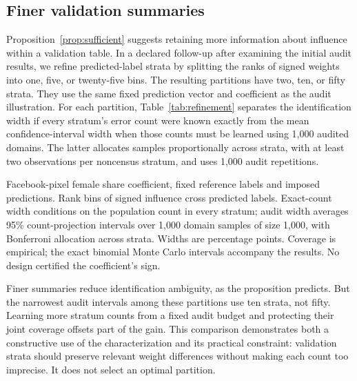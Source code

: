 \subsection{Finer validation summaries}
Proposition~\ref{prop:sufficient} suggests retaining more information about
influence within a validation table. In a declared follow-up after examining
the initial audit results, we refine predicted-label strata by splitting the
ranks of signed weights into one, five, or twenty-five bins. The resulting
partitions have two, ten, or fifty strata. They use the same fixed prediction
vector and coefficient as the audit illustration. For each partition,
Table~\ref{tab:refinement} separates the identification width if every stratum's
error count were known exactly from the mean confidence-interval width when
those counts must be learned using 1,000 audited domains. The latter allocates
samples proportionally across strata, with at least two observations per
noncensus stratum, and uses 1,000 audit repetitions.

\begin{table}[htbp]
\centering\small
\caption{Refining validation reduces ambiguity but divides the audit budget}
\label{tab:refinement}

\par\smallskip
\begin{minipage}{\linewidth}\footnotesize
Facebook-pixel female share coefficient, fixed reference labels and imposed
predictions. Rank bins of signed influence cross predicted labels. Exact-count
width conditions on the population count in every stratum; audit width averages
95\% count-projection intervals over 1,000 domain samples of size 1,000, with
Bonferroni allocation across strata. Widths are percentage points. Coverage is
empirical; the exact binomial Monte Carlo intervals accompany the results.
No design certified the coefficient's sign.
\end{minipage}
\end{table}

Finer summaries reduce identification ambiguity, as the proposition predicts.
But the narrowest audit intervals among these partitions use ten strata, not
fifty. Learning more stratum counts from a fixed audit budget and protecting
their joint coverage offsets part of the gain. This comparison demonstrates
both a constructive use of the characterization and its practical constraint:
validation strata should preserve relevant weight differences without making
each count too imprecise. It does not select an optimal partition.

